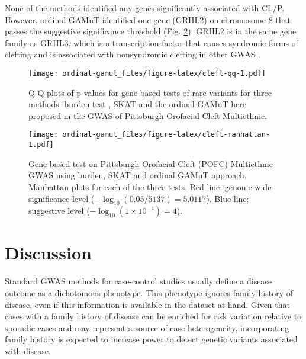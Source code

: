 \documentclass[]{article}
\theoremstyle{definition}
\theoremstyle{definition}
\theoremstyle{definition}
\theoremstyle{remark}
\begin{document}
None of the methods identified any genes significantly associated with
CL/P. However, ordinal GAMuT identified one gene (GRHL2) on chromosome 8
that passes the suggestive significance threshold (Fig.
\ref{fig:cleft-manhattan}). GRHL2 is in the same gene family as GRHL3,
which is a transcription factor that causes syndromic forms of clefting
and is associated with nonsyndromic clefting in other GWAS
\citep{Leslie2016, Leslie2016b, Carpinelli2017, PeyrardJanvid2014}.

\begin{figure}
\centering
\texttt{[image: ordinal-gamut\_files/figure-latex/cleft-qq-1.pdf]}
\caption{\label{fig:cleft-qq}Q-Q plots of p-values for gene-based tests of
rare variants for three methods: burden test \citep{Li2008, Madsen2009},
SKAT \citep{Wu2011} and the ordinal GAMuT here proposed in the GWAS of
Pittsburgh Orofacial Cleft Multiethnic.}
\end{figure}

\begin{figure}
\centering
\texttt{[image: ordinal-gamut\_files/figure-latex/cleft-manhattan-1.pdf]}
\caption{\label{fig:cleft-manhattan}Gene-based test on Pittsburgh Orofacial
Cleft (POFC) Multiethnic GWAS using burden, SKAT and ordinal GAMuT
approach. Manhattan plots for each of the three tests. Red line:
genome-wide significance level (\(-\log_{10}(0.05/5137) = 5.0117\)).
Blue line: suggestive level (\(-\log_{10}(1 \times 10 ^{-4}) = 4\)).}
\end{figure}

\hypertarget{discussion}{%
\section{Discussion}\label{discussion}}

Standard GWAS methods for case-control studies usually define a disease
outcome as a dichotomous phenotype. This phenotype ignores family
history of disease, even if this information is available in the dataset
at hand. Given that cases with a family history of disease can be
enriched for risk variation relative to sporadic cases and may represent
a source of case heterogeneity, incorporating family history is expected
to increase power to detect genetic variants associated with disease.
\end{document}
